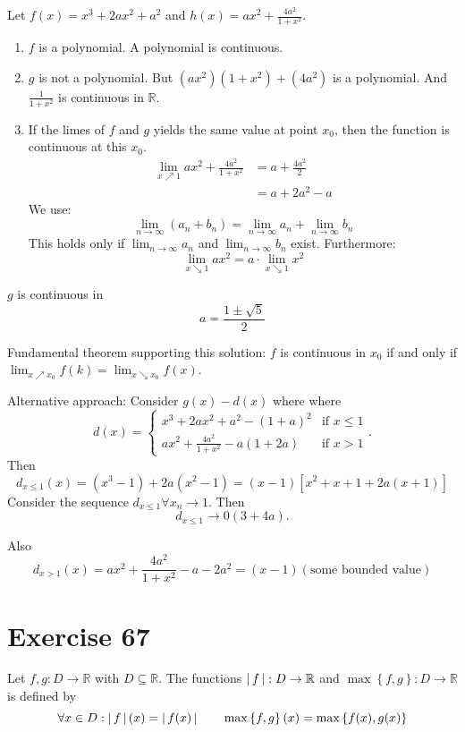 \documentclass[a4paper]{article}
\theoremstyle{definition}
\newcommand\abs[1]{\left|\thinspace #1\thinspace\right|}
\newcommand\set[1]{\left\{#1\right\}}
\begin{document}
Let $f(x) = x^3 + 2ax^2 + a^2$ and $h(x) = ax^2 + \frac{4a^2}{1 + x^2}$.

\begin{enumerate}
  \item $f$ is a polynomial. A polynomial is continuous.
  \item $g$ is not a polynomial. But $(ax^2) (1 + x^2) + (4a^2)$ is a polynomial.
    And $\frac{1}{1 + x^2}$ is continuous in $\mathbb R$.
  \item If the limes of $f$ and $g$ yields the same value at point $x_0$, then the function is continuous at this $x_0$.
    \begin{align*}
      \lim_{x \nearrow 1} ax^2 + \frac{4a^2}{1 + x^2}
        &= a + \frac{4a^2}{2} \\
        &= a + 2a^2 - a
    \end{align*}
    We use:
    \[ \lim_{n\to\infty} (a_n + b_n) = \lim_{n\to\infty} a_n + \lim_{n\to\infty} b_n \]
    This holds only if $\lim_{n\to\infty} a_n$ and $\lim_{n\to\infty} b_n$ exist.
    Furthermore:
    \[ \lim_{x \searrow 1} ax^2 = a \cdot \lim_{x \searrow 1} x^2 \]
\end{enumerate}

$g$ is continuous in
\[ a = \frac{1 \pm \sqrt{5}}{2} \]

Fundamental theorem supporting this solution:
$f$ is continuous in $x_0$ if and only if $\lim_{x \nearrow x_0} f(k) = \lim_{x \searrow x_0} f(x)$.

Alternative approach: Consider $g(x) - d(x)$ where
where
\[
  d(x) = \begin{cases}
    x^3 + 2ax^2 + a^2 - (1 + a)^2 & \text{if } x \leq 1 \\
    ax^2 + \frac{4a^2}{1 + x^2} - a(1 + 2a) & \text{if } x > 1
  \end{cases}.
\]
Then
\[
  d_{x \leq 1}(x)
    = (x^3 - 1) + 2a (x^2 - 1) = (x - 1)[x^2 + x + 1 + 2a(x + 1)]
\]
Consider the sequence $d_{x \leq 1} \forall x_n \to 1$. Then
\[ d_{x \leq 1} \to 0 (3 + 4a). \]

Also
\[
  d_{x > 1}(x)
    = ax^2 + \frac{4a^2}{1 + x^2} - a - 2a^2
    = (x - 1)(\text{some bounded value})
\]

\section{Exercise 67}
\begin{ex}
  Let $f,g: D \to \mathbb R$ with $D \subseteq \mathbb R$. The functions
  $\abs{f}: D \to \mathbb R$ and $\max\set{f,g}: D \to \mathbb R$ is defined
  by
  \[
    \forall x \in D: \abs{f}(x) = \abs{f(x)}
    \qquad \max\set{f, g}(x) = \max\set{f(x), g(x)}
  \]
\end{ex}
\end{document}
